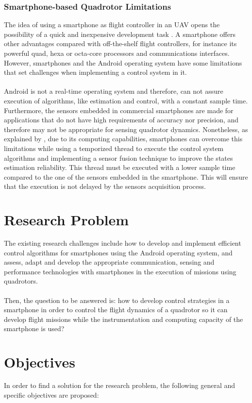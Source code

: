 \subsubsection{Smartphone-based Quadrotor Limitations}
The idea of using a smartphone as flight controller in an UAV opens the possibility of a quick and inexpensive development task \cite{Aldrovandi2015}. A smartphone offers other advantages compared with off-the-shelf flight controllers, for instance its powerful quad, hexa or octa-core processors and communications interfaces. However, smartphones and the Android operating system have some limitations that set challenges when implementing a control system in it.\\\\
Android is not a real-time operating system and therefore, can not assure execution of algorithms, like estimation and control, with a constant sample time. Furthermore, the sensors embedded in commercial smartphones are made for applications that do not have high requirements of accuracy nor precision, and therefore may not be appropriate for sensing quadrotor dynamics. Nonetheless, as explained by \cite{Bryant2015}, due to its computing capabilities, smartphones can overcome this limitations while using a temporized thread to execute the control system algorithms and implementing a sensor fusion technique to improve the states estimation reliability. This thread must be executed with a lower sample time compared to the one of the sensors embedded in the smartphone. This will ensure that the execution is not delayed by the sensors acquisition process.

\section{Research Problem}
The existing research challenges include how to develop and implement efficient control algorithms for smartphones using the Android operating system, and assess, adapt and develop the appropriate communication, sensing and performance technologies with smartphones in the execution of missions using quadrotors.
\\\\
Then, the question to be answered is: how to develop control strategies in a smartphone in order to control the flight dynamics of a quadrotor so it can develop flight missions while the instrumentation and computing capacity of the smartphone is used?

\section{Objectives}
In order to find a solution for the research problem, the following general and specific objectives are proposed:
